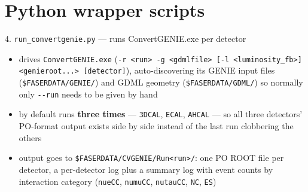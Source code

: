 \documentclass[aspectratio=169]{beamer}
\begin{document}
\section{Python wrapper scripts}

\begin{frame}{4. \texttt{run\_convertgenie.py} --- runs ConvertGENIE.exe per detector}
  \begin{itemize}
    \item drives \texttt{ConvertGENIE.exe} (\texttt{-r <run> -g <gdmlfile>
      [-l <luminosity\_fb>] <genieroot...> [detector]}), auto-discovering
      its GENIE input files (\texttt{\$FASERDATA/GENIE/}) and GDML geometry
      (\texttt{\$FASERDATA/GDML/}) so normally only \texttt{-{}-run} needs
      to be given by hand
    \item by default runs \textbf{three times} --- \texttt{3DCAL},
      \texttt{ECAL}, \texttt{AHCAL} --- so all three detectors' PO-format
      output exists side by side instead of the last run clobbering the
      others
    \item output goes to \texttt{\$FASERDATA/CVGENIE/Run<run>/}: one PO
      ROOT file per detector, a per-detector log plus a summary log with
      event counts by interaction category (\texttt{nueCC}, \texttt{numuCC},
      \texttt{nutauCC}, \texttt{NC}, \texttt{ES})
  \end{itemize}
\end{frame}
\end{document}
